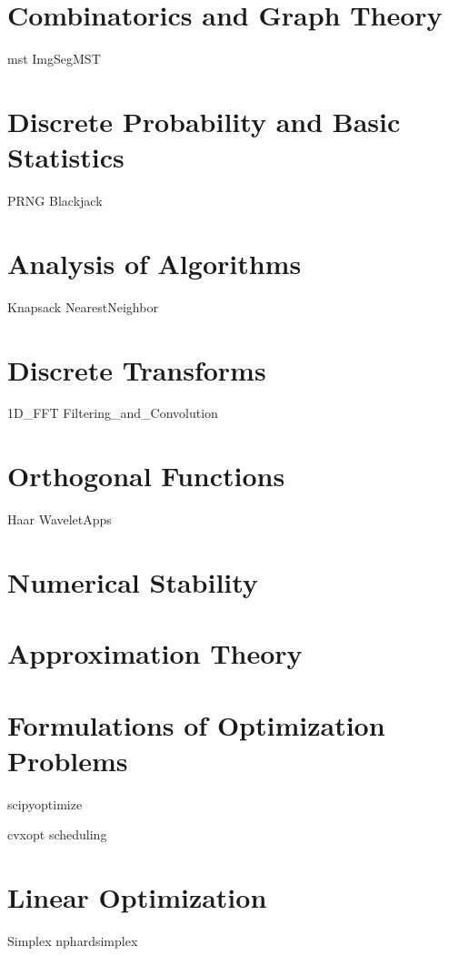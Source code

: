 \documentclass[nociteref]{newsiambook}
\begin{document}
\part{Combinatorics and Graph Theory}
{mst}
{ImgSegMST}

\part{Discrete Probability and Basic Statistics}
{PRNG}
{Blackjack}

\part{Analysis of Algorithms}
{Knapsack}
{NearestNeighbor}

\part{Discrete Transforms}
{1D_FFT}
{Filtering_and_Convolution}

\part{Orthogonal Functions}
{Haar}
{WaveletApps}

\part{Numerical Stability}

\part{Approximation Theory}

\part{Formulations of Optimization Problems}
{scipyoptimize}

{cvxopt}
{scheduling}

\part{Linear Optimization}
{Simplex}
{nphardsimplex}
\end{document}
